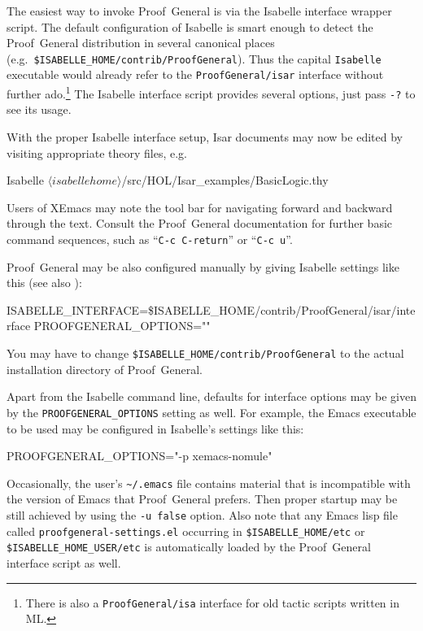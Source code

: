 The easiest way to invoke Proof~General is via the Isabelle interface wrapper
script.  The default configuration of Isabelle is smart enough to detect the
Proof~General distribution in several canonical places (e.g.\ 
\texttt{\$ISABELLE_HOME/contrib/ProofGeneral}).  Thus the capital
\texttt{Isabelle} executable would already refer to the
\texttt{ProofGeneral/isar} interface without further ado.\footnote{There is
  also a \texttt{ProofGeneral/isa} interface for old tactic scripts written in
  ML.} The Isabelle interface script provides several options, just pass
\verb,-?, to see its usage.

With the proper Isabelle interface setup, Isar documents may now be edited by
visiting appropriate theory files, e.g.\ 
\begin{ttbox}
Isabelle \({\langle}isabellehome{\rangle}\)/src/HOL/Isar_examples/BasicLogic.thy
\end{ttbox}
Users of XEmacs may note the tool bar for navigating forward and backward
through the text.  Consult the Proof~General documentation \cite{proofgeneral}
for further basic command sequences, such as ``\texttt{C-c C-return}'' or
``\texttt{C-c u}''.

\medskip

Proof~General may be also configured manually by giving Isabelle settings like
this (see also \cite{isabelle-sys}):
\begin{ttbox}
ISABELLE_INTERFACE=\$ISABELLE_HOME/contrib/ProofGeneral/isar/interface
PROOFGENERAL_OPTIONS=""
\end{ttbox}
You may have to change \texttt{\$ISABELLE_HOME/contrib/ProofGeneral} to the
actual installation directory of Proof~General.

\medskip

Apart from the Isabelle command line, defaults for interface options may be
given by the \texttt{PROOFGENERAL_OPTIONS} setting as well.  For example, the
Emacs executable to be used may be configured in Isabelle's settings like this:
\begin{ttbox}
PROOFGENERAL_OPTIONS="-p xemacs-nomule"  
\end{ttbox}

Occasionally, the user's \verb,~/.emacs, file contains material that is
incompatible with the version of Emacs that Proof~General prefers.  Then
proper startup may be still achieved by using the \texttt{-u false} option.
Also note that any Emacs lisp file called \texttt{proofgeneral-settings.el}
occurring in \texttt{\$ISABELLE_HOME/etc} or \texttt{\$ISABELLE_HOME_USER/etc}
is automatically loaded by the Proof~General interface script as well.


